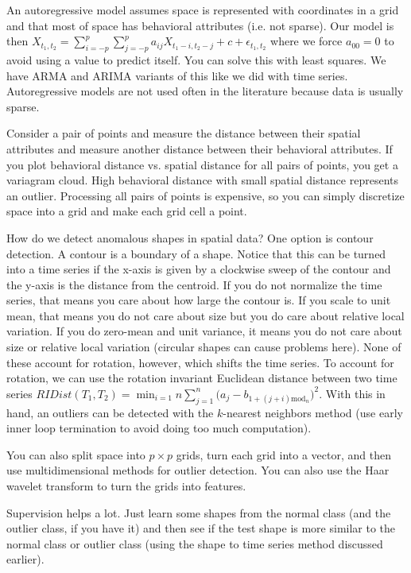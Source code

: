 \documentclass[a4paper]{article}
\begin{document}
An autoregressive model assumes space is represented with coordinates in a grid
and that most of space has behavioral attributes (i.e. not sparse). Our model
is then $X_{t_1, t_2} = \sum_{i=-p}^{p}{\sum_{j=-p}^{p}{a_{ij} X_{t_1 - i,
t_2 - j}}} + c + \epsilon_{t_1, t_2}$ where we force $a_{00} = 0$ to avoid using
a value to predict itself. You can solve this with least squares. We have ARMA
and ARIMA variants of this like we did with time series. Autoregressive models
are not used often in the literature because data is usually sparse.

Consider a pair of points and measure the distance between their spatial
attributes and measure another distance between their behavioral attributes.
If you plot behavioral distance vs. spatial distance for all pairs of
points, you get a variagram cloud. High behavioral distance with small spatial
distance represents an outlier. Processing all pairs of points is expensive,
so you can simply discretize space into a grid and make each grid cell a point.

How do we detect anomalous shapes in spatial data? One option is contour
detection. A contour is a boundary of a shape. Notice that this can be turned
into a time series if the x-axis is given by a clockwise sweep of the contour
and the y-axis is the distance from the centroid. If you do not normalize the
time series, that means you care about how large the contour is. If you scale
to unit mean, that means you do not care about size but you do care about
relative local variation. If you do zero-mean and unit variance, it means you do
not care about size or relative local variation (circular shapes can cause
problems here). None of these account for rotation, however, which shifts
the time series. To account for rotation, we can use the rotation invariant
Euclidean distance between two time series $RIDist(T_1, T_2) = \min_{i=1}{n}{
\sum_{j=1}^{n}{(a_j - b_{1 + (j+i) \textrm{mod}_n}})^2}$. With this in hand,
an outliers can be detected with the $k$-nearest neighbors method (use
early inner loop termination to avoid doing too much computation).

You can also split space into $p \times p$ grids, turn each grid into a vector,
and then use multidimensional methods for outlier detection. You can also use
the Haar wavelet transform to turn the grids into features.

Supervision helps a lot. Just learn some shapes from the normal class (and the
outlier class, if you have it) and then see if the test shape is more similar
to the normal class or outlier class (using the shape to time series method
discussed earlier).
\end{document}
